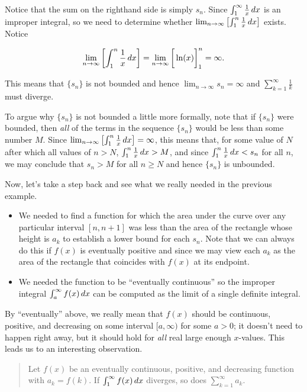 \documentclass{ximera}
\begin{document}
\begin{model}
Notice that the sum on the righthand side is simply $s_n$.  Since $\int_1^{\infty} \frac{1}{x} \mathop{}\!d x$ is an improper integral, so we need to determine whether $\lim_{n \to \infty} \left[ \int_1^n \frac{1}{x} \mathop{}\!d x \right]$ exists.  Notice

\[
\lim_{n \to \infty} \left[ \int_1^n \frac{1}{x} \mathop{}\!d x \right] = \lim_{n \to \infty} \bigg[ \ln(x) \bigg]_1^n = \infty.
\]

This means that $\{s_n\}$ is not bounded and hence $\lim_{n \to \infty} s_n = \infty$ and $\sum_{k=1}^{\infty} \frac{1}{k}$ must diverge.

\begin{remark}
To argue why $\{s_n\}$ is not bounded a little more formally, note that if $\{s_n\}$ were bounded, then \emph{all} of the terms in the sequence $\{s_n\}$ would be less than some number $M$.  Since $\lim_{n \to \infty} \left[ \int_1^n \frac{1}{x} \mathop{}\!d x \right] =  \infty$, this means that, for some value of $N$ after which all values of $n>N$, $ \int_1^n \frac{1}{x} \mathop{}\!d x > M$, and since $\int_1^n \frac{1}{x} \mathop{}\!d x < s_n$ for all $n$, we may conclude that $s_n >M$ for all $n\geq N$ and hence $\{s_n\}$ is unbounded.
\end{remark}

\end{model}

Now, let's take a step back and see what we really needed in the previous example.

\begin{itemize}
\item We needed to find a function for which the area under the curve over any particular interval $[n,n+1]$ was less than the area of the rectangle whose height is $a_k$ to establish a lower bound for each $s_n$.  Note that we can always do this if $f(x)$ is eventually positive and  since we may view each $a_k$ as the area of the rectangle that coincides with $f(x)$ at its  endpoint.
\item We needed the function to be ``eventually continuous'' so the improper integral $\int_{a}^{\infty} f(x) \mathop{}\!d x$ can be computed as the limit of a single definite integral.
\end{itemize}

By ``eventually'' above, we really mean that $f(x)$ should be continuous, positive, and decreasing on some interval $[a,\infty)$ for some $a>0$; it doesn't need to happen right away, but it should hold for \emph{all} real large enough $x$-values.  This leads us to an interesting observation.
\begin{quote}
  Let $f(x)$ be an eventually continuous, positive, and decreasing function with
    $a_k = f(k)$.  If $\int_1^\infty f(x) \mathop{}\!d x$ diverges, so does
    $\sum_{k=1}^\infty a_k$.
\end{quote}
\end{document}

